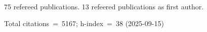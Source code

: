 75 refereed publications. 13 refeered publications as first author.

Total citations~=~5167; h-index~=~38 (2025-09-15)